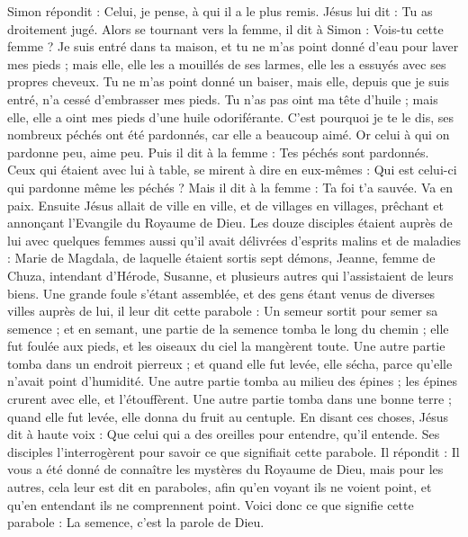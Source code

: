 \begin{multicols}{2}
Simon répondit : Celui, je pense, à qui il a le plus remis. Jésus lui dit : Tu as droitement jugé.
Alors se tournant vers la femme, il dit à Simon : Vois-tu cette femme ? Je suis entré dans ta maison, et tu ne m'as point donné d'eau pour laver mes pieds ; mais elle, elle les a mouillés de ses larmes, elle les a essuyés avec ses propres cheveux.
Tu ne m'as point donné un baiser, mais elle, depuis que je suis entré, n'a cessé d'embrasser mes pieds.
Tu n'as pas oint ma tête d'huile ; mais elle, elle a oint mes pieds d'une huile odoriférante.
C'est pourquoi je te le dis, ses nombreux péchés ont été pardonnés, car elle a beaucoup aimé. Or celui à qui on pardonne peu, aime peu.
Puis il dit à la femme : Tes péchés sont pardonnés.
Ceux qui étaient avec lui à table, se mirent à dire en eux-mêmes : Qui est celui-ci qui pardonne même les péchés ?
Mais il dit à la femme : Ta foi t'a sauvée. Va en paix.
\VerseOne{}Ensuite Jésus allait de ville en ville, et de villages en villages, prêchant et annonçant l'Evangile du Royaume de Dieu.
Les douze disciples étaient auprès de lui avec quelques femmes aussi qu'il avait délivrées d'esprits malins et de maladies : Marie de Magdala, de laquelle étaient sortis sept démons,
Jeanne, femme de Chuza, intendant d'Hérode, Susanne, et plusieurs autres qui l'assistaient de leurs biens.
Une grande foule s'étant assemblée, et des gens étant venus de diverses villes auprès de lui, il leur dit cette parabole :
Un semeur sortit pour semer sa semence ; et en semant, une partie de la semence tomba le long du chemin ; elle fut foulée aux pieds, et les oiseaux du ciel la mangèrent toute.
Une autre partie tomba dans un endroit pierreux ; et quand elle fut levée, elle sécha, parce qu'elle n'avait point d'humidité.
Une autre partie tomba au milieu des épines ; les épines crurent avec elle, et l'étouffèrent.
Une autre partie tomba dans une bonne terre ; quand elle fut levée, elle donna du fruit au centuple. En disant ces choses, Jésus dit à haute voix : Que celui qui a des oreilles pour entendre, qu'il entende.
Ses disciples l'interrogèrent pour savoir ce que signifiait cette parabole.
Il répondit : Il vous a été donné de connaître les mystères du Royaume de Dieu, mais pour les autres, cela leur est dit en paraboles, afin qu'en voyant ils ne voient point, et qu'en entendant ils ne comprennent point.
Voici donc ce que signifie cette parabole : La semence, c'est la parole de Dieu.

\end{multicols}
